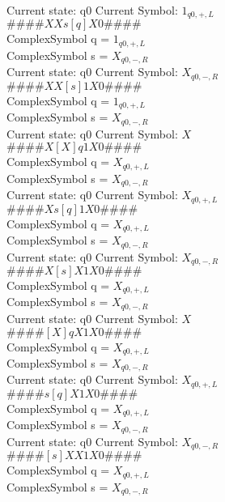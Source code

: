 \documentclass[10pt, a4paper]{article}
\begin{document}
 \medskip
Current state: q0	 Current Symbol: 	 $1_{q0,+,L}$\\
$\# \#\# \# X X s [ q ] X 0 \# \# \# \# $ \\
ComplexSymbol q = $1_{q0,+,L}$ \\
ComplexSymbol s = $X_{q0,-,R}$ \\ 
 \medskip
Current state: q0	 Current Symbol: 	 $X_{q0,-,R}$\\
$\# \#\# \# X X [ s ] 1 X 0 \# \# \# \# $ \\
ComplexSymbol q = $1_{q0,+,L}$ \\
ComplexSymbol s = $X_{q0,-,R}$ \\ 
 \medskip
Current state: q0	 Current Symbol: 	 $X$\\
$\# \#\# \# X [ X ] q 1 X 0 \# \# \# \# $ \\
ComplexSymbol q = $X_{q0,+,L}$ \\
ComplexSymbol s = $X_{q0,-,R}$ \\ 
 \medskip
Current state: q0	 Current Symbol: 	 $X_{q0,+,L}$\\
$\# \#\# \# X s [ q ] 1 X 0 \# \# \# \# $ \\
ComplexSymbol q = $X_{q0,+,L}$ \\
ComplexSymbol s = $X_{q0,-,R}$ \\ 
 \medskip
Current state: q0	 Current Symbol: 	 $X_{q0,-,R}$\\
$\# \#\# \# X [ s ] X 1 X 0 \# \# \# \# $ \\
ComplexSymbol q = $X_{q0,+,L}$ \\
ComplexSymbol s = $X_{q0,-,R}$ \\ 
 \medskip
Current state: q0	 Current Symbol: 	 $X$\\
$\# \#\# \# [ X ] q X 1 X 0 \# \# \# \# $ \\
ComplexSymbol q = $X_{q0,+,L}$ \\
ComplexSymbol s = $X_{q0,-,R}$ \\ 
 \medskip
Current state: q0	 Current Symbol: 	 $X_{q0,+,L}$\\
$\# \#\# \# s [ q ] X 1 X 0 \# \# \# \# $ \\
ComplexSymbol q = $X_{q0,+,L}$ \\
ComplexSymbol s = $X_{q0,-,R}$ \\ 
 \medskip
Current state: q0	 Current Symbol: 	 $X_{q0,-,R}$\\
$\# \#\# \# [ s ] X X 1 X 0 \# \# \# \# $ \\
ComplexSymbol q = $X_{q0,+,L}$ \\
ComplexSymbol s = $X_{q0,-,R}$ \\ 
\end{document}

